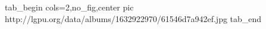  
 
 
 
 


\ifcmt
  tab_begin cols=2,no_fig,center
		pic http://lgpu.org/data/albums/1632922970/61546d7a942ef.jpg
  tab_end
\fi
